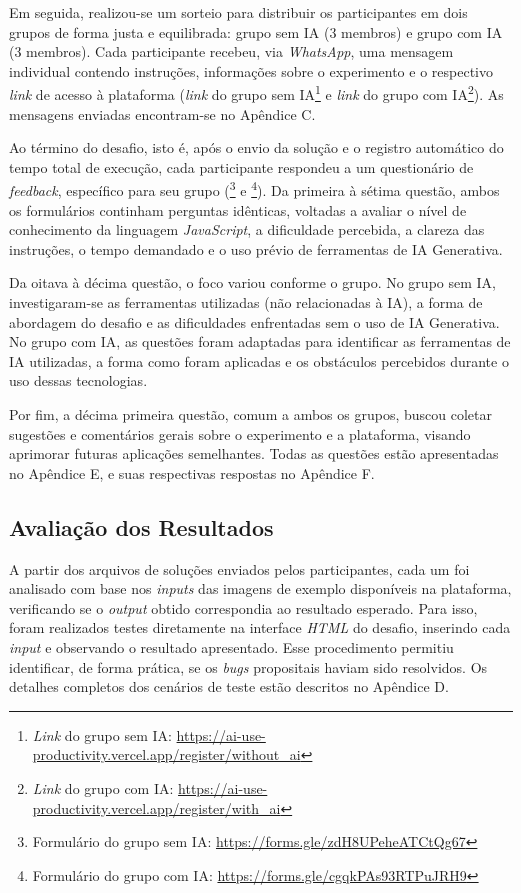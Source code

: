 \documentclass[english,brazilian]{UNISINOSartigo} %
\begin{document}
Em seguida, realizou-se um sorteio para distribuir os participantes em dois grupos de forma justa e equilibrada: grupo sem IA (3 membros) e grupo com IA (3 membros). Cada participante recebeu, via \textit{WhatsApp}, uma mensagem individual contendo instruções, informações sobre o experimento e o respectivo \textit{link} de acesso à plataforma (\textit{link} do grupo sem IA\footnote{\textit{Link} do grupo sem IA: \url{https://ai-use-productivity.vercel.app/register/without_ai}} e \textit{link} do grupo com IA\footnote{\textit{Link} do grupo com IA: \url{https://ai-use-productivity.vercel.app/register/with_ai}}). As mensagens enviadas encontram-se no Apêndice C.

Ao término do desafio, isto é, após o envio da solução e o registro automático do tempo total de execução, cada participante respondeu a um questionário de \textit{feedback}, específico para seu grupo (\footnote{Formulário do grupo sem IA: \url{https://forms.gle/zdH8UPeheATCtQg67}} e \footnote{Formulário do grupo com IA: \url{https://forms.gle/cgqkPAs93RTPuJRH9}}). Da primeira à sétima questão, ambos os formulários continham perguntas idênticas, voltadas a avaliar o nível de conhecimento da linguagem \textit{JavaScript}, a dificuldade percebida, a clareza das instruções, o tempo demandado e o uso prévio de ferramentas de IA Generativa.

Da oitava à décima questão, o foco variou conforme o grupo. No grupo sem IA, investigaram-se as ferramentas utilizadas (não relacionadas à IA), a forma de abordagem do desafio e as dificuldades enfrentadas sem o uso de IA Generativa. No grupo com IA, as questões foram adaptadas para identificar as ferramentas de IA utilizadas, a forma como foram aplicadas e os obstáculos percebidos durante o uso dessas tecnologias.

Por fim, a décima primeira questão, comum a ambos os grupos, buscou coletar sugestões e comentários gerais sobre o experimento e a plataforma, visando aprimorar futuras aplicações semelhantes. Todas as questões estão apresentadas no Apêndice E, e suas respectivas respostas no Apêndice F.

\subsection{Avaliação dos Resultados}

A partir dos arquivos de soluções enviados pelos participantes, cada um foi analisado com base nos \textit{inputs} das imagens de exemplo disponíveis na plataforma, verificando se o \textit{output} obtido correspondia ao resultado esperado. Para isso, foram realizados testes diretamente na interface \textit{HTML} do desafio, inserindo cada \textit{input} e observando o resultado apresentado. Esse procedimento permitiu identificar, de forma prática, se os \textit{bugs} propositais haviam sido resolvidos. Os detalhes completos dos cenários de teste estão descritos no Apêndice D.
\end{document}
